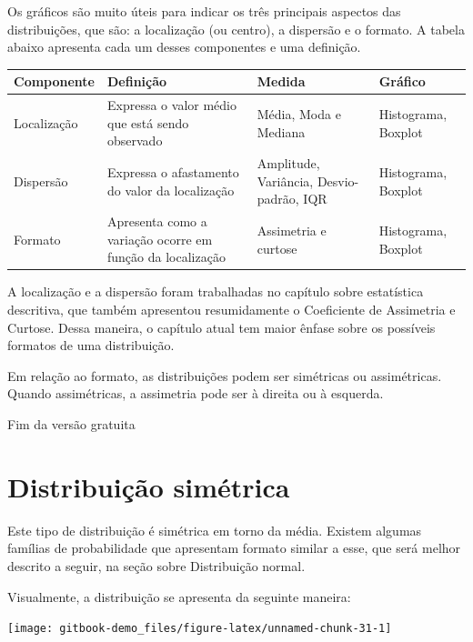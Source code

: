 \documentclass[
]{book}
\begin{document}
Os gráficos são muito úteis para indicar os três principais aspectos das distribuições, que são: a localização (ou centro), a dispersão e o formato. A tabela abaixo apresenta cada um desses componentes e uma definição.

\begin{longtable}[]{@{}
  >{\raggedright\arraybackslash}p{}
  >{\raggedright\arraybackslash}p{}
  >{\raggedright\arraybackslash}p{}
  >{\raggedright\arraybackslash}p{}@{}}
\toprule
Componente & Definição & Medida & Gráfico \\
\midrule
\endhead
Localização & Expressa o valor médio que está sendo observado & Média, Moda e Mediana & Histograma, Boxplot \\
Dispersão & Expressa o afastamento do valor da localização & Amplitude, Variância, Desvio-padrão, IQR & Histograma, Boxplot \\
Formato & Apresenta como a variação ocorre em função da localização & Assimetria e curtose & Histograma, Boxplot \\
\bottomrule
\end{longtable}

A localização e a dispersão foram trabalhadas no capítulo sobre estatística descritiva, que também apresentou resumidamente o Coeficiente de Assimetria e Curtose. Dessa maneira, o capítulo atual tem maior ênfase sobre os possíveis formatos de uma distribuição.

Em relação ao formato, as distribuições podem ser simétricas ou assimétricas. Quando assimétricas, a assimetria pode ser à direita ou à esquerda.

Fim da versão gratuita

\hypertarget{distribuiuxe7uxe3o-simuxe9trica}{%
\section{Distribuição simétrica}\label{distribuiuxe7uxe3o-simuxe9trica}}

Este tipo de distribuição é simétrica em torno da média. Existem algumas famílias de probabilidade que apresentam formato similar a esse, que será melhor descrito a seguir, na seção sobre Distribuição normal.

Visualmente, a distribuição se apresenta da seguinte maneira:

\begin{center}\texttt{[image: gitbook-demo\_files/figure-latex/unnamed-chunk-31-1]} \end{center}
\end{document}
